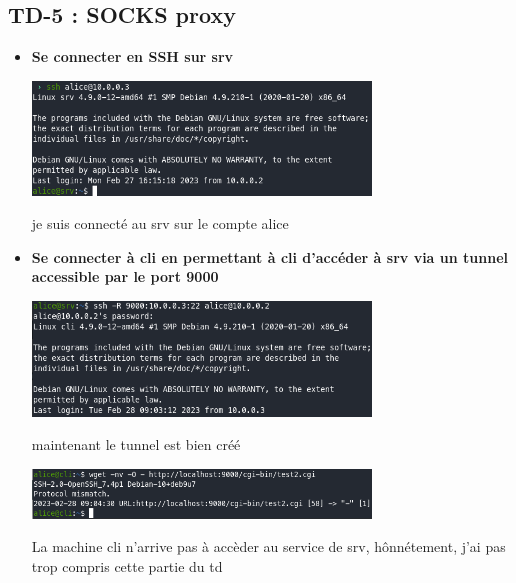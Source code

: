 \documentclass[12pt]{article}
\begin{document}
  \subsection{TD-5 : SOCKS proxy}
  \vspace{0.3cm}

\begin{itemize}
  \item \textbf{Se connecter en SSH sur srv}
  \vspace{0.3cm}

  \includegraphics[width=9cm]{images/screen-ssh-td5-1.png}
  \vspace{0.3cm}

  je suis connecté au srv sur le compte alice
\end{itemize}
\vspace{0.3cm}

\begin{itemize}
  \item \textbf{Se connecter à cli en permettant à cli d’accéder à srv via un tunnel accessible par le port 9000}
  \vspace{0.3cm}

  \includegraphics[width=9cm]{images/screen-ssh-td5-2.png}
  \vspace{0.3cm}

  maintenant le tunnel est bien créé
  \vspace{0.3cm}

  \includegraphics[width=9cm]{images/screen-ssh-td5-3.png}
  \vspace{0.3cm}

  La machine cli n'arrive pas à accèder au service de srv, hônnétement, j'ai pas trop compris cette partie du td
\end{itemize}
\vspace{0.3cm}
\end{document}
